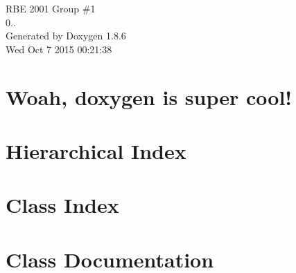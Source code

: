 \documentclass[twoside]{book}
\newcommand{\clearemptydoublepage}{%
  \newpage{\pagestyle{empty}\cleardoublepage}%
}
\begin{document}
\hypersetup{pageanchor=false}
\begin{titlepage}
\vspace*{7cm}
\begin{center}%
{\Large R\-B\-E 2001 Group \#1 \\[1ex]\large 0.. }\\
\vspace*{1cm}
{\large Generated by Doxygen 1.8.6}\\
\vspace*{0.5cm}
{\small Wed Oct 7 2015 00:21:38}\\
\end{center}
\end{titlepage}
\clearemptydoublepage
\tableofcontents
\clearemptydoublepage
{}
\hypersetup{pageanchor=true}

\chapter{Woah, doxygen is super cool!}
\label{index}\hypertarget{index}{}
\chapter{Hierarchical Index}

\chapter{Class Index}

\chapter{Class Documentation}








































\newpage
{}
{}
\printindex
\end{document}
